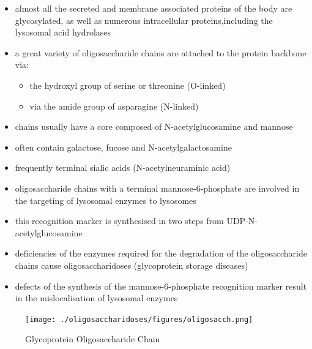 \documentclass{scrartcl}
\begin{document}
\begin{itemize}
\item almost all the secreted and membrane associated proteins of the body
are glycosylated, as well as numerous intracellular
proteins,including the lysosomal acid hydrolases
\item a great variety of oligosaccharide chains are attached to the
protein backbone via:
\begin{itemize}
\item the hydroxyl group of serine or threonine (O-linked)
\item via the amide group of asparagine (N-linked)
\end{itemize}

\item chains usually have a core composed of N-acetylglucosamine and mannose
\item often contain galactose, fucose and N-acetylgalactosamine
\item frequently terminal sialic acids (N-acetylneuraminic acid)
\item oligosaccharide chains with a terminal mannose-6-phosphate are
involved in the targeting of lysosomal enzymes to lysosomes
\item this recognition marker is synthesised in two steps from UDP-N-acetylglucosamine

\item deficiencies of the enzymes required for the degradation of the
oligosaccharide chains cause oligosaccharidoses (glycoprotein storage diseases)

\item defects of the synthesis of the mannose-6-phosphate recognition
marker result in the mislocalisation of lysosomal enzymes
\end{itemize}


\begin{figure}[htbp]
\centering
\texttt{[image: ./oligosaccharidoses/figures/oligosacch.png]}
\caption{\label{fig:org8e08789}
Glycoprotein Oligosaccharide Chain}
\end{figure}
\end{document}
